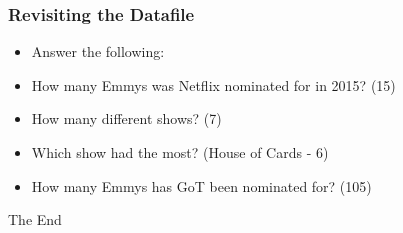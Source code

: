 \documentclass[14pt]{beamer}
\begin{document}
\begin{frame}
\frametitle{Revisiting the Datafile}
\begin{itemize}
	\Large
	\item[] Answer the following:
	\normalsize
	\item[] How many Emmys was Netflix nominated for in 2015? (15)
	\item[] How many different shows? (7)
	\item[] Which show had the most? (House of Cards - 6)
	\item[] How many Emmys has GoT been nominated for? (105)
\end{itemize}
\end{frame}


\begin{frame}
\Huge{\centerline{The End}}
\end{frame}

\end{document}
